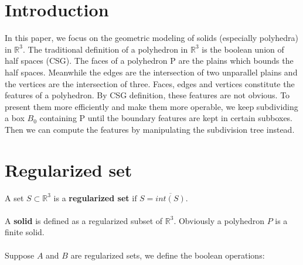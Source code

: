 \documentclass[twoside]{article}
\begin{document}
\begin{multicols}{2} %

\section{Introduction}
\noindent In this paper, we focus on the geometric modeling of solids (especially polyhedra) in $\mathbb{R}^3$. The traditional definition of a polyhedron in $\mathbb{R}^3$ is the boolean union of half spaces (CSG).  The faces of a polyhedron P are the plains which bounds the half spaces. Meanwhile the edges are the intersection of two unparallel plains and the vertices are the intersection of three. Faces, edges and vertices constitute the features of a polyhedron. By CSG definition, these features are not obvious. To present them more efficiently and make them more operable, we keep subdividing a box $B_0$ containing P until the boundary features are kept in certain subboxes. Then we can compute the features by manipulating the subdivision tree instead. 

\iffalse
Solid modeling is distinguished from related areas of geometric modeling and computer graphics by its emphasis on physical fidelity. Together, the principles of geometric and solid modeling form the foundation of computer-aided design and in general support the creation, exchange, visualization, animation, interrogation, and annotation of digital models of physical objects.

\\
\\
\indent
We describe a polyhedron as three sets : $(V, E, F)$. $V$ represents the set of vertices of the polyhedron. $E$ represents the set of edges of the polyhedron. $F$ represents the set of faces of the polyhedron.
\fi

\section{Regularized set}

      A set $S\subset \mathbb{R}^3$ is a \textbf{regularized set} $\textrm{if}$ $S=\overline{int (S)}$. 
      \\
      \\
      \indent
      A \textbf{solid} is defined as a regularized subset of $\mathbb{R}^3$. Obviously a polyhedron $P$ is a finite solid.
      \\
      \\
      \indent
 Suppose $A$ and $B$ are regularized sets, we define the boolean operations:
 \begin{itemize}


\end{itemize}
\end{multicols}
\end{document}
